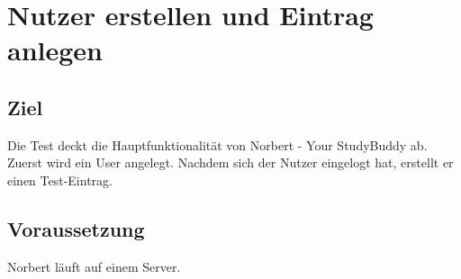 
\chapter{Nutzer erstellen und Eintrag anlegen}
\section{Ziel}
Die Test deckt die Hauptfunktionalität von Norbert - Your StudyBuddy ab. Zuerst wird ein User angelegt. Nachdem sich der Nutzer eingelogt hat, erstellt er einen Test-Eintrag.


\section{Voraussetzung}
Norbert läuft auf einem Server. 

